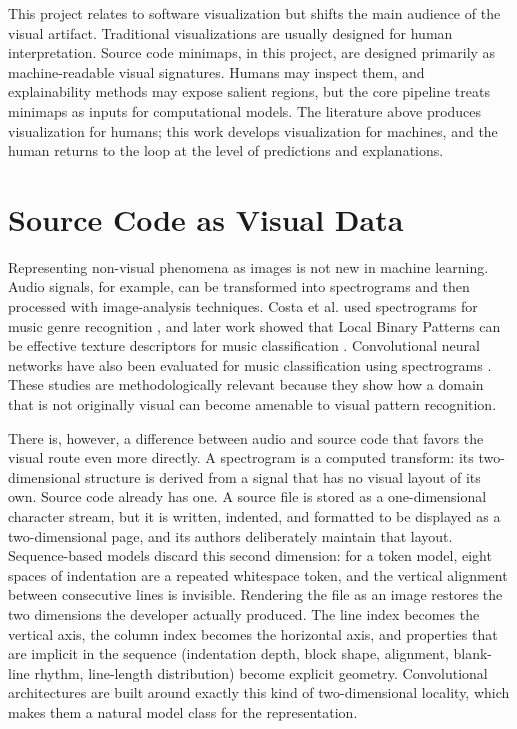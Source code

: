 This project relates to software visualization but shifts the main audience of
the visual artifact. Traditional visualizations are usually designed for human
interpretation. Source code minimaps, in this project, are designed primarily as
machine-readable visual signatures. Humans may inspect them, and explainability
methods may expose salient regions, but the core pipeline treats minimaps as
inputs for computational models. The literature above produces visualization
for humans; this work develops visualization for machines, and the human
returns to the loop at the level of predictions and explanations.

\section{Source Code as Visual Data}

Representing non-visual phenomena as images is not new in machine learning.
Audio signals, for example, can be transformed into spectrograms and then
processed with image-analysis techniques. Costa et al. used spectrograms for
music genre recognition \cite{costa2011music}, and later work showed that Local
Binary Patterns can be effective texture descriptors for music classification
\cite{costa2012music}. Convolutional neural networks have also been evaluated
for music classification using spectrograms \cite{costa2017cnn}. These studies
are methodologically relevant because they show how a domain that is not
originally visual can become amenable to visual pattern recognition.

There is, however, a difference between audio and source code that favors the
visual route even more directly. A spectrogram is a computed transform: its
two-dimensional structure is derived from a signal that has no visual layout of
its own. Source code already has one. A source file is stored as a
one-dimensional character stream, but it is written, indented, and formatted to
be displayed as a two-dimensional page, and its authors deliberately maintain
that layout. Sequence-based models discard this second dimension: for a token
model, eight spaces of indentation are a repeated whitespace token, and the
vertical alignment between consecutive lines is invisible. Rendering the file
as an image restores the two dimensions the developer actually produced. The
line index becomes the vertical axis, the column index becomes the horizontal
axis, and properties that are implicit in the sequence (indentation depth,
block shape, alignment, blank-line rhythm, line-length distribution) become
explicit geometry. Convolutional architectures are built around exactly this
kind of two-dimensional locality, which makes them a natural model class for
the representation.

